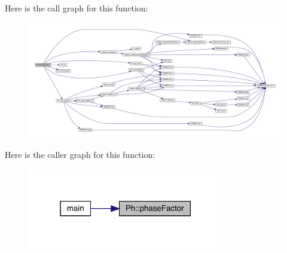 Here is the call graph for this function\+:
\nopagebreak
\begin{figure}[H]
\begin{center}
\leavevmode
\includegraphics[width=350pt]{d6/d3c/namespacePh_abd30593224e56992e6e15dc98728ad0b_cgraph}
\end{center}
\end{figure}
Here is the caller graph for this function\+:
\nopagebreak
\begin{figure}[H]
\begin{center}
\leavevmode
\includegraphics[width=243pt]{d6/d3c/namespacePh_abd30593224e56992e6e15dc98728ad0b_icgraph}
\end{center}
\end{figure}
